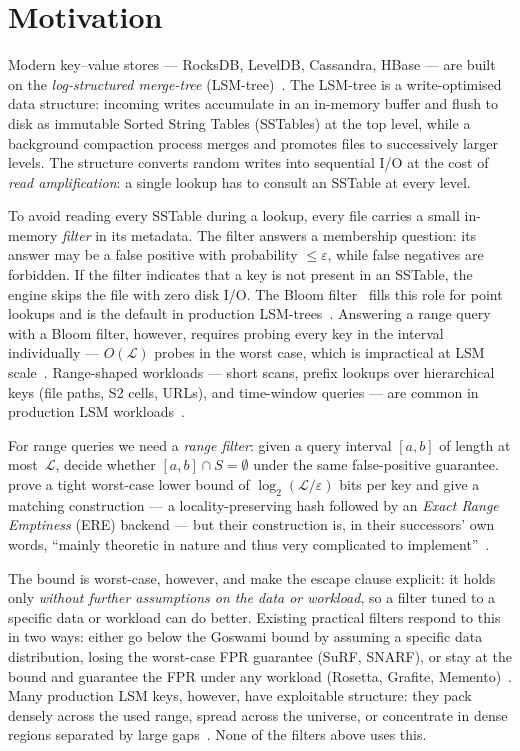 \section{Motivation}
\label{sec:motivation}

Modern key--value stores --- RocksDB, LevelDB, Cassandra, HBase --- are built
on the \emph{log-structured merge-tree} (LSM-tree)~\citep{oneil1996lsm}.
The LSM-tree is a write-optimised data structure: incoming writes accumulate in an in-memory
buffer and flush to disk as immutable Sorted String Tables (SSTables)
at the top level, while a background compaction process merges and promotes
files to successively larger levels.
The structure converts random writes into
sequential I/O at the cost of \emph{read amplification}: a single lookup
has to consult an SSTable at every level.

To avoid reading every SSTable during a lookup, every file carries a small in-memory
\emph{filter} in its metadata.
The filter answers a membership question:
its answer may be a false positive with probability $\leq \varepsilon$, while false negatives are forbidden.
If the filter indicates that a key is not present in an SSTable, the engine
skips the file with zero disk I/O.
The Bloom filter~\citep{bloom1970space}
fills this role for point lookups and is the default in production
LSM-trees~\citep{monkey2017,dong2021rocksdb}.
Answering a range query with a Bloom filter, however, requires probing every key in the interval individually --- $O(\mathcal{L})$ probes in the worst case, which is impractical at LSM scale~\citep{zhang2018surf}.
Range-shaped workloads --- short scans, prefix lookups over hierarchical keys (file paths, S2 cells,
URLs), and time-window queries --- are common in production LSM workloads~\citep{cao2020facebook}.

For range queries we need a \emph{range filter}: given a query interval
$[a, b]$ of length at most~$\mathcal{L}$, decide whether $[a, b] \cap S = \emptyset$
under the same false-positive guarantee.
\citet{goswami2015approximate} prove a tight worst-case lower bound of
$\log_2(\mathcal{L}/\varepsilon)$ bits per key and give a matching
construction --- a locality-preserving hash followed by an
\emph{Exact Range Emptiness} (ERE) backend --- but their construction
is, in their successors' own words, ``mainly theoretic in nature and
thus very complicated to implement''~\citep{grafite2024}.

The bound is worst-case, however, and \citet{vaidya2022snarf} make
the escape clause explicit: it holds only \emph{without further assumptions on the data or workload},
so a filter tuned to a specific data or workload can do better.
Existing practical filters respond to this in two ways:
either go below the Goswami bound by assuming a specific data distribution,
losing the worst-case FPR guarantee (SuRF, SNARF),
or stay at the bound and guarantee the FPR under any workload
(Rosetta, Grafite, Memento)~\citep{luo2020rosetta,grafite2024,eslami2024memento}.
Many production LSM keys, however, have exploitable structure: they pack densely across the used range, spread across the universe, or concentrate in dense regions separated by large gaps~\citep{cao2020facebook}.
None of the filters above uses this.

